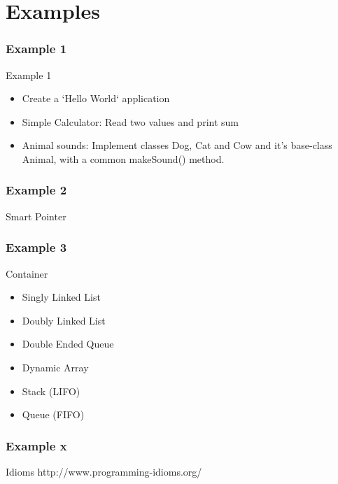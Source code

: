 \documentclass{beamer}
\begin{document}
\part{Examples}

\section{Example 1}
\begin{frame}{Example 1}
\begin{itemize}
  \item Create a `Hello World` application
  \item Simple Calculator: Read two values and print sum
  \item Animal sounds: Implement classes Dog, Cat and Cow and it's base-class
  Animal, with a common makeSound() method.
\end{itemize}
\end{frame}

\section{Example 2}

\begin{frame}{Smart Pointer}
\subtitle{}
\end{frame}

\section{Example 3}

\begin{frame}{Container}
\begin{itemize}
  \item Singly Linked List
  \item Doubly Linked List
  \item Double Ended Queue
  \item Dynamic Array
  \item Stack (LIFO)
  \item Queue (FIFO)
\end{itemize}
\end{frame}


\section{Example x}
\begin{frame}{Idioms}
http://www.programming-idioms.org/
\end{frame}
\end{document}
